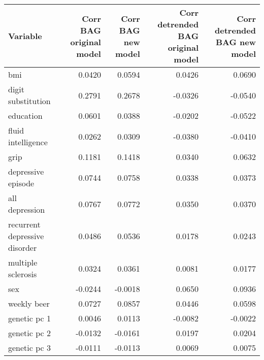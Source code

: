 \begin{tabular}{lrrrr}
\toprule
                     Variable &  Corr BAG original model &  Corr BAG new model &  Corr detrended BAG original model &  Corr detrended BAG new model \\
\midrule
                          bmi &                   0.0420 &              0.0594 &                             0.0426 &                        0.0690 \\
           digit substitution &                   0.2791 &              0.2678 &                            -0.0326 &                       -0.0540 \\
                    education &                   0.0601 &              0.0388 &                            -0.0202 &                       -0.0522 \\
           fluid intelligence &                   0.0262 &              0.0309 &                            -0.0380 &                       -0.0410 \\
                         grip &                   0.1181 &              0.1418 &                             0.0340 &                        0.0632 \\
           depressive episode &                   0.0744 &              0.0758 &                             0.0338 &                        0.0373 \\
               all depression &                   0.0767 &              0.0772 &                             0.0350 &                        0.0370 \\
recurrent depressive disorder &                   0.0486 &              0.0536 &                             0.0178 &                        0.0243 \\
           multiple sclerosis &                   0.0324 &              0.0361 &                             0.0081 &                        0.0177 \\
                          sex &                  -0.0244 &             -0.0018 &                             0.0650 &                        0.0936 \\
                  weekly beer &                   0.0727 &              0.0857 &                             0.0446 &                        0.0598 \\
                 genetic pc 1 &                   0.0046 &              0.0113 &                            -0.0082 &                       -0.0022 \\
                 genetic pc 2 &                  -0.0132 &             -0.0161 &                             0.0197 &                        0.0204 \\
                 genetic pc 3 &                  -0.0111 &             -0.0113 &                             0.0069 &                        0.0075 \\
\bottomrule
\end{tabular}
